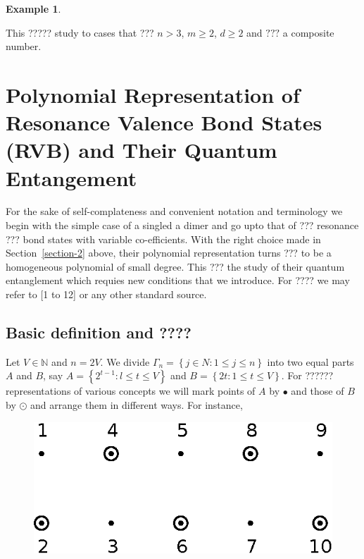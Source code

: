 \documentclass[a4paper,12pt]{article}
\theoremstyle{definition}
\theoremstyle{underlinethm}
\newtheorem{example}{Example}[section]
\theoremstyle{definition}
\begin{document}
\begin{example}
\begin{enumerate}[label=(\roman*)]
 \end{enumerate}
 This ????? study to cases that ??? $n > 3$, $m \geq 2$, $d \geq 2$ and $???$ a composite number.
\end{example} 

\section{Polynomial Representation of Resonance Valence Bond States (RVB) and Their Quantum Entangement}\label{section-3}

For the sake of self-complateness and convenient notation and terminology we begin with the simple case of a singled a dimer and go upto that of ??? resonance ??? bond states with variable co-efficients. With the right choice made in Section~\ref{section-2} above, their polynomial representation turns ??? to be a homogeneous polynomial of small degree. This ??? the study of their quantum entanglement which requies new conditions that we introduce. For ???? we may refer to [1 to  12] or any other standard source.

\subsection{Basic definition and ????}\label{subsection-3.1}

Let $V \in \mathbb{N}$ and $n=2V$. We divide $\Gamma_{n} = \left\{j \in N : 1 \leq j \leq n\right\}$ into two equal parts $A$ and $B$, say $A = \left\{2^{t-1} : l \leq t \leq V\right\}$ and $B = \left\{ 2t : 1 \leq t \leq V \right\}$. For ?????? representations of various concepts we will mark points of $A$ by $\bullet$ and those of $B$ by $\odot$ and arrange them in different ways. For instance,

\begin{figure}
\centering
\includegraphics[scale=.8]{figure/fig2.eps}
\caption{}\label{fig02}
\end{figure}
\end{document}
